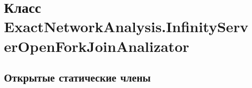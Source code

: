 \hypertarget{class_exact_network_analysis_1_1_infinity_server_open_fork_join_analizator}{}\section{Класс Exact\+Network\+Analysis.\+Infinity\+Server\+Open\+Fork\+Join\+Analizator}
\label{class_exact_network_analysis_1_1_infinity_server_open_fork_join_analizator}


 


\subsection*{Открытые статические члены}
